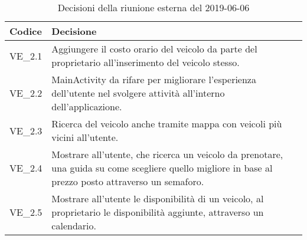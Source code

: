 	\begin{longtable}{ >{\centering}p{} >{}p{}}
		\caption{Decisioni della riunione esterna del 2019-06-06}\\	
		\rowcolorhead
		\textbf{\color{white}Codice} 
		& \centering\textbf{\color{white}Decisione} 
		\tabularnewline 
		\endfirsthead
		VE\_2.1 & Aggiungere il costo orario del veicolo da parte del proprietario all'inserimento del veicolo stesso.
		
		\tabularnewline 
		VE\_2.2 & MainActivity da rifare per migliorare l'esperienza dell'utente nel svolgere attività all'interno dell'applicazione.
		
		\tabularnewline 
		VE\_2.3 & Ricerca del veicolo anche tramite mappa con veicoli più vicini all'utente.
		
		\tabularnewline 
		VE\_2.4 & Mostrare all'utente, che ricerca un veicolo da prenotare, una guida su come scegliere quello migliore in base al prezzo posto attraverso un semaforo.
		
		\tabularnewline 
		VE\_2.5 & Mostrare all'utente le disponibilità di un veicolo, al proprietario le disponibilità aggiunte, attraverso un calendario.
		
	
	\end{longtable}
	




